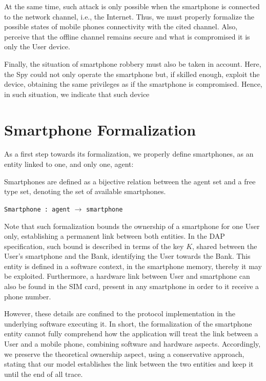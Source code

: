 At the same time, such attack is only possible when the smartphone is connected to the network channel, i.e., the Internet. Thus, we must properly formalize the possible states of mobile phones connectivity with the cited channel. Also, perceive that the offline channel remains secure and what is compromised it is only the User device.

Finally, the situation of smartphone robbery must also be taken in account. Here, the Spy could not only operate the smartphone but, if skilled enough, exploit the device, obtaining the same privileges as if the smartphone is compromised. Hence, in such situation, we indicate that such device





\section{Smartphone Formalization}
As a first step towards its formalization, we properly define smartphones, as an entity linked to one, and only one, agent:

\begin{definition}
  Smartphones are defined as a bijective relation between the agent set and a free type set, denoting the set of available smartphones.
  \begin{center}
    \texttt{Smartphone : agent} $\longrightarrow$ \texttt{smartphone}
  \end{center}
\end{definition}

Note that such formalization bounds the ownership of a smartphone for one User only, establishing a permanent link between both entities. In the DAP specification, such bound is described in terms of the key $K$, shared between the User's smartphone and the Bank, identifying the User towards the Bank. This entity is defined in a software context, in the smartphone memory, thereby it may be exploited. Furthermore, a hardware link between User and smartphone can also be found in the SIM card, present in any smartphone in order to it receive a phone number.

However, these details are confined to the protocol implementation in the underlying software executing it. In short, the formalization of the smartphone entity cannot fully comprehend how the application will treat the link between a User and a mobile phone, combining software and hardware aspects. Accordingly, we preserve the theoretical ownership aspect, using a conservative approach, stating that our model establishes the link between the two entities and keep it until the end of all trace.





